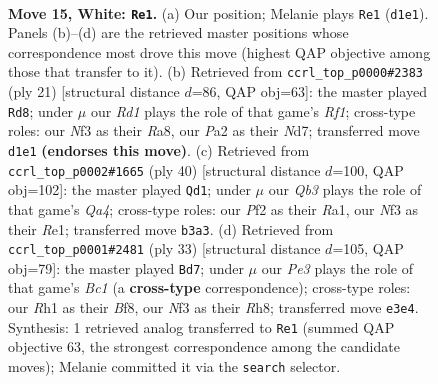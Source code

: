 \documentclass[11pt]{article}
\begin{document}
\clearpage

\begin{figure}[p]\centering
\begin{subfigure}{0.46\textwidth}\centering
\resizebox{\linewidth}{!}{%
\newchessgame
\chessboard[
  setfen={1rbr2k1/p1p1qpp1/2n1pn2/2Pp3p/1p1P4/1Q2PNP1/PP1B1P1P/2KR1B1R w - - 0 15},
  showmover=false,
  pgfstyle=straightmove, color=movearrow, markmove={d1-e1}
]}
\caption{}
\end{subfigure}\hfill
\begin{subfigure}{0.46\textwidth}\centering
\resizebox{\linewidth}{!}{%
\newchessgame
\chessboard[
  setfen={r1b2rk1/1p1nbpp1/p1p1pq1p/3p4/2PP4/2N1PN2/PPQ1BPPP/RR4K1 b - - 1 11},
  showmover=false,
  pgfstyle=straightmove, color=movearrow, markmove={f8-d8}
]}
\caption{}
\end{subfigure}
\\[4pt]
\begin{subfigure}{0.46\textwidth}\centering
\resizebox{\linewidth}{!}{%
\newchessgame
\chessboard[
  setfen={r2q1rk1/1p2nppp/2p1n3/p1Pp1b2/Q2P4/P1N1B1P1/1P3P1P/R3RBK1 w - - 0 21},
  showmover=false,
  pgfstyle=straightmove, color=movearrow, markmove={a4-d1}
]}
\caption{}
\end{subfigure}\hfill
\begin{subfigure}{0.46\textwidth}\centering
\resizebox{\linewidth}{!}{%
\newchessgame
\chessboard[
  setfen={r1b1kb1r/5pp1/1nn1p2p/qp1pP3/2pP4/P1P2N2/1BBQNPPP/1R2R1K1 b kq - 3 17},
  showmover=false,
  pgfstyle=straightmove, color=movearrow, markmove={c8-d7}
]}
\caption{}
\end{subfigure}
\caption{\textbf{Move 15, White: \texttt{Re1}.} (a) Our position; Melanie plays \texttt{Re1} (\texttt{d1e1}). Panels (b)--(d) are the retrieved master positions whose correspondence most drove this move (highest QAP objective among those that transfer to it). (b) Retrieved from \texttt{ccrl\_top\_p0000\#2383} (ply 21) [structural distance $d$=86, QAP obj=63]: the master played \texttt{Rd8}; under $\mu$ our \emph{Rd1} plays the role of that game's \emph{Rf1}; cross-type roles: our \emph{N}f3 as their \emph{R}a8, our \emph{P}a2 as their \emph{N}d7; transferred move \texttt{d1e1} \textbf{(endorses this move)}. (c) Retrieved from \texttt{ccrl\_top\_p0002\#1665} (ply 40) [structural distance $d$=100, QAP obj=102]: the master played \texttt{Qd1}; under $\mu$ our \emph{Qb3} plays the role of that game's \emph{Qa4}; cross-type roles: our \emph{P}f2 as their \emph{R}a1, our \emph{N}f3 as their \emph{R}e1; transferred move \texttt{b3a3}. (d) Retrieved from \texttt{ccrl\_top\_p0001\#2481} (ply 33) [structural distance $d$=105, QAP obj=79]: the master played \texttt{Bd7}; under $\mu$ our \emph{Pe3} plays the role of that game's \emph{Bc1} (a \textbf{cross-type} correspondence); cross-type roles: our \emph{R}h1 as their \emph{B}f8, our \emph{N}f3 as their \emph{R}h8; transferred move \texttt{e3e4}. Synthesis: 1 retrieved analog transferred to \texttt{Re1} (summed QAP objective 63, the strongest correspondence among the candidate moves); Melanie committed it via the \texttt{search} selector.}
\label{fig:thought-m28}
\end{figure}
\end{document}
